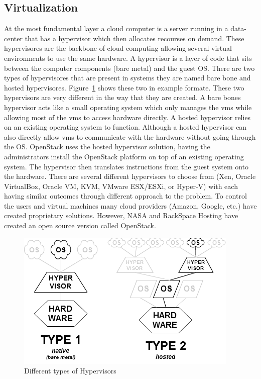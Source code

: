 \documentclass[12pt]{article}
\begin{document}
\subsection{Virtualization}
At the most fundamental layer a cloud computer is a server running in a data-center that has a hypervisor which then allocates recourses on demand. These hypervisores are the backbone of cloud computing allowing several virtual environments to use the same hardware. A hypervisor is a layer of code that sits between the computer components (bare metal) and the guest OS\@. There are two types of hypervisores that are present in systems they are named bare bone and hosted hypervisores. Figure~\ref{fig:Hypervisors} shows these two in example formate. These two hypervisors are very different in the way that they are created.  A bare bones hypervisor acts like a small operating system which only manages the vms while allowing most of the vms to access hardware directly. A hosted hypervisor relies on an existing operating system to function. Although a hosted hypervisor can also directly allow vms to communicate with the hardware without going through the OS\@. OpenStack uses the hosted hypervisor solution, having the administrators install the OpenStack platform on top of an existing operating system.   The hypervisor then translates instructions from the guest system onto the hardware. There are several different hypervisors to choose from (Xen, Oracle VirtualBox, Oracle VM, KVM, VMware ESX/ESXi, or Hyper-V) with each having similar outcomes through different approach to the problem. To control the users and virtual machines many cloud providers (Amazon, Google, etc.) have created proprietary solutions. However, NASA and RackSpace Hosting \cite{wikipedia1} have created an open source version called OpenStack.

\begin{figure}[H]
    \centering
    \includegraphics[scale=.8]{./pic/Hyperviseur.png}
    \caption{Different types of Hypervisors}
    \label{fig:Hypervisors}
\end{figure}
\end{document}
